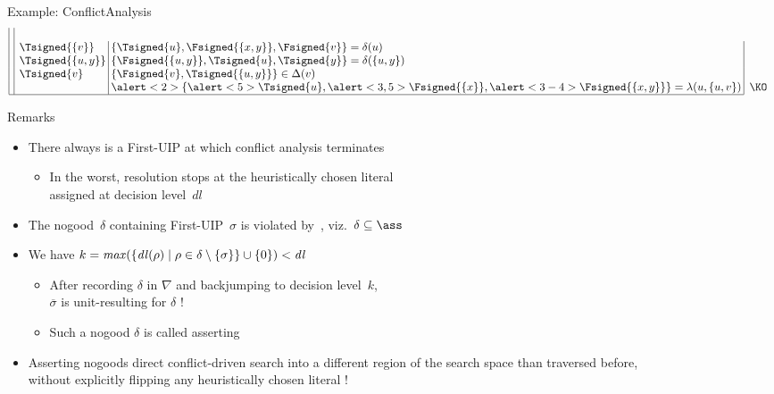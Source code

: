\begin{frame}{Example: {ConflictAnalysis}}
\[\begin{array}{|@{\:}c@{\:}|@{\:}l@{\:}l@{\:}|@{\:}l@{\:}|l}
\\
  & & \Tsigned{\{v\}} & \{\Tsigned{u},\Fsigned{\{x,y\}},\Fsigned\{v\}\}=\clno{u}
\\
  & & \Tsigned{\{u,y\}} & \{\Fsigned{\{u,y\}},\Tsigned{u},\Tsigned{y}\}=\clno{\{u,y\}}
\\
  & & \Tsigned{v} & \{\Fsigned{v},\Tsigned{\{u,y\}}\}\in\ClNo{v}
\\
  & & & \alert<2>{\{\alert<5>{\Tsigned{u}},\alert<3,5>{\Fsigned{\{x\}}},\alert<3-4>{\Fsigned{\{x,y\}}}\}}=\lambda(u,\{u,v\}) & \text{\KO}
\\\cline{1-4}
\end{array}
\]
\end{frame}
\begin{frame}{Remarks}
\begin{itemize}
\item
There always is a First-UIP at which conflict analysis terminates
\begin{itemize}
\item
In the worst, resolution stops at the
heuristically chosen literal\\ assigned at decision level~$\mathit{dl}$
\end{itemize}
\pause
\item
The nogood~$\delta$ containing First-UIP~$\sigma$ is violated by~\ass,
viz.\ $\delta\subseteq\ass$
\item
We have $k=\mathit{max}(\{\mathit{dl}(\rho)\mid\rho\in\delta\setminus\{\sigma\}\}\cup\{0\})<\mathit{dl}$
\pause
  \begin{itemize}
  \item
  After recording $\delta$ in $\nabla$ and backjumping to decision level~$k$,\\
  $\overline{\sigma}$ is unit-resulting for $\delta$ !
  \item
  Such a nogood $\delta$ is called \alert{asserting}
  \end{itemize}
\pause
\item
Asserting nogoods direct conflict-driven search into a different
region of the search space than traversed before,\\
without explicitly flipping any heuristically chosen literal !
\end{itemize}
\end{frame}
